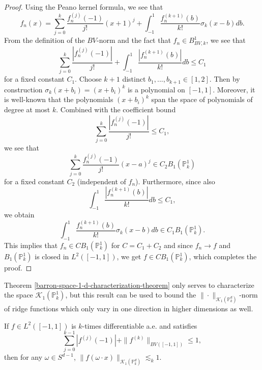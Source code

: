 \begin{proof}
Using the Peano kernel formula, we see that
\begin{equation}
 f_n(x) = \sum_{j=0}^{k} \frac{f_n^{(j)}(-1)}{j!}(x+1)^j + \int_{-1}^1 \frac{f_n^{(k+1)}(b)}{k!}\sigma_k(x-b)db.
\end{equation}
From the definition of the $BV$-norm and the fact that $f_n\in B^1_{BV,k}$, we see that
\begin{equation}
 \sum_{j=0}^{k} \frac{|f_n^{(j)}(-1)|}{j!}+ \int_{-1}^1 \frac{|f_n^{(k+1)}(b)|}{k!}db \leq C_1
\end{equation}
for a fixed constant $C_1$. Choose $k+1$ distinct $b_1,...,b_{k+1}\in [1, 2]$. Then by construction $\sigma_k(x+b_i) = (x+b_i)^k$ is a polynomial on $[-1,1]$. Moreover, it is well-known that the polynomials $(x+b_i)^k$ span the space of polynomials of degree at most $k$. Combined with the coefficient bound
\begin{equation}
 \sum_{j=0}^{k} \frac{|f_n^{(j)}(-1)|}{j!} \leq C_1,
\end{equation}
we see that
\begin{equation}
 \sum_{j=0}^{k} \frac{f_n^{(j)}(-1)}{j!}(x-a)^j \in C_2B_1(\mathbb{P}^1_k)
\end{equation}
for a fixed constant $C_2$ (independent of $f_n$). Furthermore, since also
\begin{equation}
 \int_{-1}^1 \frac{|f_n^{(k+1)}(b)|}{k!}db \leq C_1,
\end{equation}
we obtain
\begin{equation}
 \int_{-1}^1 \frac{f_n^{(k+1)}(b)}{k!}\sigma_k(x-b)db\in C_1B_1(\mathbb{P}^1_k).
\end{equation}
This implies that $f_n\in CB_1(\mathbb{P}^1_k)$ for $C = C_1 + C_2$ and since $f_n\rightarrow f$ and $B_1(\mathbb{P}^1_k)$ is closed in $L^2([-1,1])$, we get $f\in CB_1(\mathbb{P}^1_k)$, which completes the proof.

\end{proof}

Theorem \ref{barron-space-1-d-characterization-theorem} only serves to characterize the space $\mathcal{K}_1(\mathbb{P}_k^1)$, but this result can be used to bound the $\|\cdot\|_{\mathcal{K}_1(\mathbb{P}^d_k)}$-norm of ridge functions which only vary in one direction in higher dimensions as well.
\begin{corollary}\label{ridge-corollary}
 If $f\in L^2([-1,1])$ is $k$-times differentiable a.e. and satisfies
 \begin{equation}\label{bound-530}
  \sum_{j=0}^{k-1} |f^{(j)}(-1)| + \|f^{(k)}\|_{BV([-1,1])} \leq 1,
 \end{equation}
 then for any $\omega\in S^{d-1}$, $\|f(\omega\cdot x)\|_{\mathcal{K}_1(\mathbb{P}^d_k)} \lesssim_k 1$.
\end{corollary}


